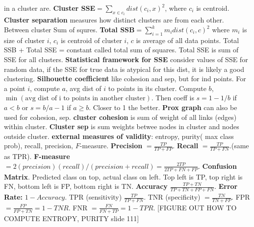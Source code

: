 \documentclass{amsbook}
\theoremstyle{plain}
\theoremstyle{definition}
\theoremstyle{remark}
\newcommand{\fracc}{\frac}
\newcommand{\lpar}{\left(}
\newcommand{\rpar}{\right)}
\begin{document}
in a cluster are. \textbf{Cluster SSE}$ = \sum_{x \in c_i}dist(c_i,x)^2$, where $c_i$ is centroid. \textbf{Cluster separation} measures how distinct clusters are from each other. Between cluster Sum of squres. \textbf{Total SSB}$ = \sum_{i = 1}^k m_i dist(c_i,c)^2$ where $m_i$ is size of cluster $i$, $c_i$ is centroid of cluster $i$, $c$ is average of all data points. Total SSB + Total SSE = constant called total sum of squares. Total SSE is sum of SSE for all clusters. \textbf{Statistical framework for SSE} consider values of SSE for random data, if the SSE for true data is atypical for this dist, it is likely a good clustering. \textbf{Silhouette coefficient} like cohesion and sep, but for ind points. For a point $i$, compute $a$, avg dist of $i$ to points in its cluster. Compute $b$, $\min\lpar \text{avg dist of i to points in another cluster} \rpar $. Then coeff is $s = 1 - 1/b$ if $a < b$ or $s = b/a - 1$ if $a \geq b$. Closer to 1 the better. \textbf{Prox graph} can also be used for cohesion, sep. \textbf{cluster cohesion} is sum of weight of all links (edges) within cluster. \textbf{Cluster sep} is sum weights betwee nodes in cluster and nodes outside cluster. \textbf{external measures of validity}: entropy, purity( max class prob), recall, precision, $F$-measure. \textbf{Precision} $ = \fracc{TP}{TP + FP}$. \textbf{Recall} $= \fracc{TP}{TP + FN}$.(same as TPR). \textbf{F-measure} $ = 2(precision)(recall)/(precision + recall) = \fracc{2TP}{2TP + FN + FP}$. \textbf{Confusion Matrix}. Predicted class on top, actual class on left. Top left is TP, top right is FN, bottom left is FP, bottom right is TN. \textbf{Accuracy} $\fracc{TP + TN}{TP + TN + FP + FN}$. \textbf{Error Rate: } $1 - Accuracy$. TPR (sensitivity) $\fracc{TP}{TP + FN}$. TNR (specificity) $= \fracc{TN}{TN + FP}$. FPR $= \fracc{FP}{FP + TN} = 1 - TNR$. FNR $= \fracc{FN}{FN + TP} = 1 - TPR$. [FIGURE OUT HOW TO COMPUTE ENTROPY, PURITY slide 111]
\end{document}
